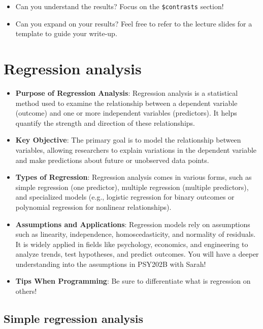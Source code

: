 \documentclass[
]{book}
\begin{document}
\begin{itemize}
\item
  Can you understand the results? Focus on the \texttt{\$contrasts} section!
\item
  Can you expand on your results? Feel free to refer to the lecture slides for a template to guide your write-up.
\end{itemize}

\section{Regression analysis}\label{regression-analysis}

\begin{itemize}
\item
  \textbf{Purpose of Regression Analysis}: Regression analysis is a statistical method used to examine the relationship between a dependent variable (outcome) and one or more independent variables (predictors). It helps quantify the strength and direction of these relationships.
\item
  \textbf{Key Objective}: The primary goal is to model the relationship between variables, allowing researchers to explain variations in the dependent variable and make predictions about future or unobserved data points.
\item
  \textbf{Types of Regression}: Regression analysis comes in various forms, such as simple regression (one predictor), multiple regression (multiple predictors), and specialized models (e.g., logistic regression for binary outcomes or polynomial regression for nonlinear relationships).
\item
  \textbf{Assumptions and Applications}: Regression models rely on assumptions such as linearity, independence, homoscedasticity, and normality of residuals. It is widely applied in fields like psychology, economics, and engineering to analyze trends, test hypotheses, and predict outcomes. You will have a deeper understanding into the assumptions in PSY202B with Sarah!
\item
  \textbf{Tips When Programming}: Be sure to differentiate what is regression on others!
\end{itemize}

\subsection{Simple regression analysis}\label{simple-regression-analysis}
\end{document}
